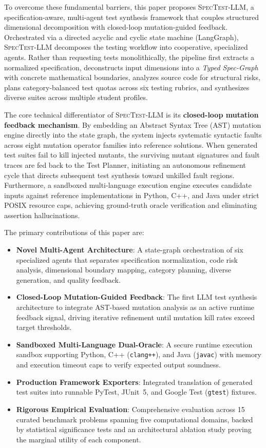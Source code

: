 \documentclass[conference]{IEEEtran}
\begin{document}
To overcome these fundamental barriers, this paper proposes \textsc{SpecTest-LLM}, a specification-aware, multi-agent test synthesis framework that couples structured dimensional decomposition with closed-loop mutation-guided feedback. Orchestrated via a directed acyclic and cyclic state machine (LangGraph), \textsc{SpecTest-LLM} decomposes the testing workflow into cooperative, specialized agents. Rather than requesting tests monolithically, the pipeline first extracts a normalized specification, deconstructs input dimensions into a \emph{Typed Spec-Graph} with concrete mathematical boundaries, analyzes source code for structural risks, plans category-balanced test quotas across six testing rubrics, and synthesizes diverse suites across multiple student profiles.

The core technical differentiator of \textsc{SpecTest-LLM} is its \textbf{closed-loop mutation feedback mechanism}. By embedding an Abstract Syntax Tree (AST) mutation engine directly into the state graph, the system injects systematic syntactic faults across eight mutation operator families into reference solutions. When generated test suites fail to kill injected mutants, the surviving mutant signatures and fault traces are fed back to the Test Planner, initiating an autonomous refinement cycle that directs subsequent test synthesis toward unkilled fault regions. Furthermore, a sandboxed multi-language execution engine executes candidate inputs against reference implementations in Python, C++, and Java under strict POSIX resource caps, achieving ground-truth oracle verification and eliminating assertion hallucinations.

The primary contributions of this paper are:
\begin{itemize}
    \item \textbf{Novel Multi-Agent Architecture}: A state-graph orchestration of six specialized agents that separates specification normalization, code risk analysis, dimensional boundary mapping, category planning, diverse generation, and quality feedback.
    \item \textbf{Closed-Loop Mutation-Guided Feedback}: The first LLM test synthesis architecture to integrate AST-based mutation analysis as an active runtime feedback signal, driving iterative refinement until mutation kill rates exceed target thresholds.
    \item \textbf{Sandboxed Multi-Language Dual-Oracle}: A secure runtime execution sandbox supporting Python, C++ (\texttt{clang++}), and Java (\texttt{javac}) with memory and execution timeout caps to verify expected output soundness.
    \item \textbf{Production Framework Exporters}: Integrated translation of generated test suites into runnable PyTest, JUnit~5, and Google Test (\texttt{gtest}) fixtures.
    \item \textbf{Rigorous Empirical Evaluation}: Comprehensive evaluation across 15 curated benchmark problems spanning five computational domains, backed by statistical significance tests and an architectural ablation study proving the marginal utility of each component.
\end{itemize}
\end{document}
